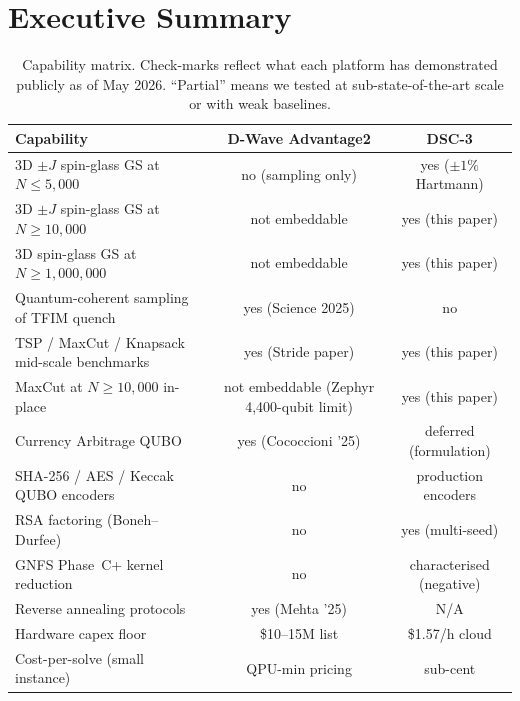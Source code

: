 \documentclass[11pt,a4paper]{article}
\begin{document}
\section*{Executive Summary}

\begin{table}[h]
\centering
\caption{Capability matrix. Check-marks reflect what each platform has
demonstrated publicly as of May 2026. ``Partial'' means we tested at
sub-state-of-the-art scale or with weak baselines.}
\label{tab:capability_matrix}
\small
\begin{tabular}{lcc}
\toprule
Capability & D-Wave Advantage2 & DSC-3 \\
\midrule
3D $\pm J$ spin-glass GS at $N\!\le\!5{,}000$  & no (sampling only) & yes ($\pm 1\%$ Hartmann) \\
3D $\pm J$ spin-glass GS at $N\!\ge\!10{,}000$ & not embeddable     & yes (this paper) \\
3D spin-glass GS at $N\!\ge\!1{,}000{,}000$    & not embeddable     & yes (this paper) \\
Quantum-coherent sampling of TFIM quench        & yes (Science 2025) & no \\
TSP / MaxCut / Knapsack mid-scale benchmarks    & yes (Stride paper)  & yes (this paper) \\
MaxCut at $N\!\ge\!10{,}000$ in-place           & not embeddable (Zephyr 4{,}400-qubit limit) & yes (this paper) \\
Currency Arbitrage QUBO                          & yes (Cococcioni '25) & deferred (formulation) \\
SHA-256 / AES / Keccak QUBO encoders            & no                  & production encoders \\
RSA factoring (Boneh--Durfee)                   & no                  & yes (multi-seed) \\
GNFS Phase~C+ kernel reduction                  & no                  & characterised (negative) \\
Reverse annealing protocols                     & yes (Mehta '25)     & N/A \\
Hardware capex floor                             & \$10--15M list      & \$1.57/h cloud \\
Cost-per-solve (small instance)                  & QPU-min pricing     & sub-cent \\
\bottomrule
\end{tabular}
\end{table}
\end{document}
